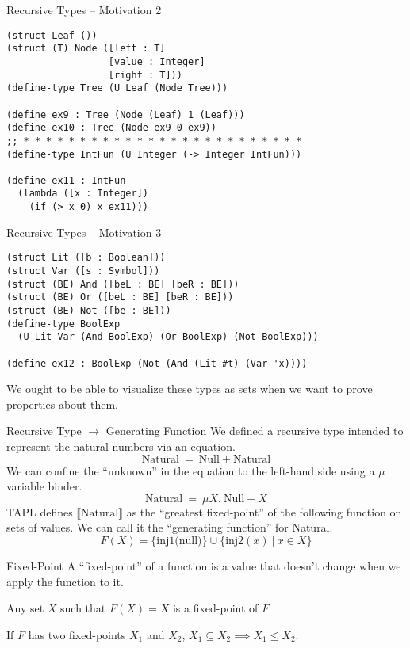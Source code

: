 \documentclass[hyperref={colorlinks = true, urlcolor = blue},pdf]{beamer}
\newcommand{\Semantic}[1]{\llbracket {#1} \rrbracket}
\newcommand{\SuchThat}{\ \vert\ }
\begin{document}
\begin{frame}[fragile]{Recursive Types -- Motivation 2}
\begin{verbatim}
(struct Leaf ())
(struct (T) Node ([left : T]
                  [value : Integer]
                  [right : T]))
(define-type Tree (U Leaf (Node Tree)))

(define ex9 : Tree (Node (Leaf) 1 (Leaf)))
(define ex10 : Tree (Node ex9 0 ex9))
;; * * * * * * * * * * * * * * * * * * * * * * * * *
(define-type IntFun (U Integer (-> Integer IntFun)))

(define ex11 : IntFun
  (lambda ([x : Integer])
    (if (> x 0) x ex11)))
\end{verbatim}
\end{frame}
\begin{frame}[fragile]{Recursive Types -- Motivation 3}
\begin{verbatim}
(struct Lit ([b : Boolean]))
(struct Var ([s : Symbol]))
(struct (BE) And ([beL : BE] [beR : BE]))
(struct (BE) Or ([beL : BE] [beR : BE]))
(struct (BE) Not ([be : BE]))
(define-type BoolExp
  (U Lit Var (And BoolExp) (Or BoolExp) (Not BoolExp)))

(define ex12 : BoolExp (Not (And (Lit #t) (Var 'x))))
\end{verbatim}
We ought to be able to visualize these types as sets when we want to prove
properties about them.
\end{frame}
\begin{frame}{Recursive Type $\rightarrow$ Generating Function}
  We defined a recursive type intended to represent the natural numbers via an
  equation.
  \begin{equation*}
    \text{Natural}\ =\ \text{Null} + \text{Natural}
  \end{equation*}
  We can confine the ``unknown'' in the equation to the left-hand side using a
  $\mu$ variable binder.
  \begin{equation*}
    \text{Natural}\ =\ \mu X .\ \text{Null} + X
  \end{equation*}
  TAPL defines $\Semantic{\text{Natural}}$ as the ``greatest fixed-point'' of
  the following function on sets of values. We can call it the
  ``generating function'' for Natural.
  \begin{equation*}
    F(X) = \{ \text{inj1(null)} \} \cup \{ \text{inj2}(x) \SuchThat x \in X \}
  \end{equation*}
\end{frame}
\begin{frame}{Fixed-Point}
  A ``fixed-point'' of a function is a value that doesn't change when we apply
  the function to it.
  \medskip

  Any set $X$ such that $F(X) = X$ is a fixed-point of $F$
  \medskip

  If $F$ has two fixed-points $X_1$ and $X_2$,
  $X_1 \subseteq X_2 \implies X_1 \leq X_2$.
\end{frame}
\end{document}
